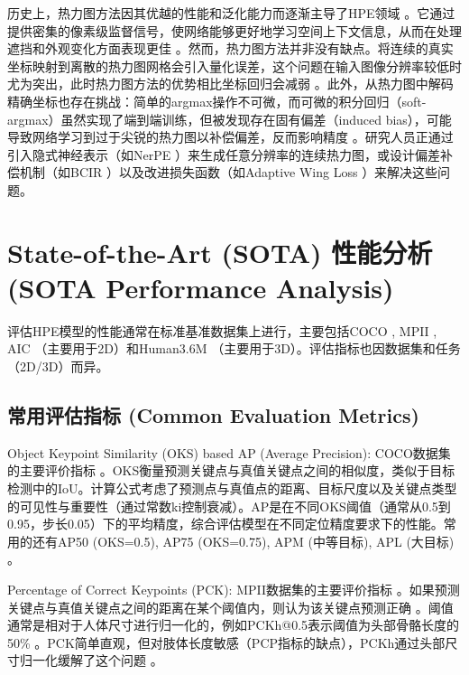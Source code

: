 \documentclass[12pt,a4paper]{article}
\begin{document}
历史上，热力图方法因其优越的性能和泛化能力而逐渐主导了HPE领域 \cite{Toshev2014DeepPose}。它通过提供密集的像素级监督信号，使网络能够更好地学习空间上下文信息，从而在处理遮挡和外观变化方面表现更佳 \cite{Toshev2014DeepPose}。然而，热力图方法并非没有缺点。将连续的真实坐标映射到离散的热力图网格会引入量化误差，这个问题在输入图像分辨率较低时尤为突出，此时热力图方法的优势相比坐标回归会减弱 \cite{Toshev2014DeepPose}。此外，从热力图中解码精确坐标也存在挑战：简单的argmax操作不可微，而可微的积分回归（soft-argmax）虽然实现了端到端训练，但被发现存在固有偏差（induced bias），可能导致网络学习到过于尖锐的热力图以补偿偏差，反而影响精度 \cite{Huang2021BiasCompensated}。研究人员正通过引入隐式神经表示（如NerPE \cite{Zhan2022ContinuousHeatmap}）来生成任意分辨率的连续热力图，或设计偏差补偿机制（如BCIR \cite{Huang2021BiasCompensated}）以及改进损失函数（如Adaptive Wing Loss \cite{Wang2019AdaptiveWing}）来解决这些问题。

\section{State-of-the-Art (SOTA) 性能分析 (SOTA Performance Analysis)}
评估HPE模型的性能通常在标准基准数据集上进行，主要包括COCO \cite{Lin2014COCO}, MPII \cite{Andriluka2014MPII}, AIC \cite{He2022MAE}（主要用于2D）和Human3.6M \cite{Ionescu2014Human36M}（主要用于3D）。评估指标也因数据集和任务（2D/3D）而异。

\subsection{常用评估指标 (Common Evaluation Metrics)}
Object Keypoint Similarity (OKS) based AP (Average Precision): COCO数据集的主要评价指标 \cite{Lin2014COCO}。OKS衡量预测关键点与真值关键点之间的相似度，类似于目标检测中的IoU。计算公式考虑了预测点与真值点的距离、目标尺度以及关键点类型的可见性与重要性（通过常数ki控制衰减）\cite{Lin2014COCO}。AP是在不同OKS阈值（通常从0.5到0.95，步长0.05）下的平均精度，综合评估模型在不同定位精度要求下的性能。常用的还有AP50 (OKS=0.5), AP75 (OKS=0.75), APM (中等目标), APL (大目标) \cite{Lin2014COCO}。

Percentage of Correct Keypoints (PCK): MPII数据集的主要评价指标 \cite{Lin2014COCO}。如果预测关键点与真值关键点之间的距离在某个阈值内，则认为该关键点预测正确 \cite{Lin2014COCO}。阈值通常是相对于人体尺寸进行归一化的，例如PCKh@0.5表示阈值为头部骨骼长度的50\% \cite{Lin2014COCO}。PCK简单直观，但对肢体长度敏感（PCP指标的缺点），PCKh通过头部尺寸归一化缓解了这个问题 \cite{Andriluka2014MPII}。
\end{document}

